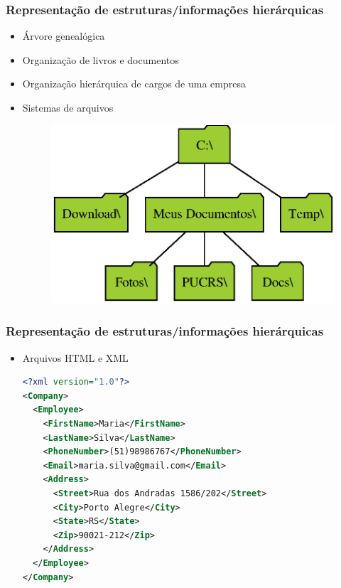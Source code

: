 \documentclass[aspectratio=169]{beamer}
\begin{document}
\begin{frame}\frametitle{Representação de estruturas/informações hierárquicas}
\begin{itemize}
	\item Árvore genealógica
	\item Organização de livros e documentos
	\item Organização hierárquica de cargos de uma empresa
	\item Sistemas de arquivos
\begin{figure}[h]
	\centering
	\includegraphics[height=0.4\paperheight]{imagens/arvore_de_diretorios.eps}
\end{figure}
\end{itemize}
\end{frame}

\begin{frame}[fragile]\frametitle{Representação de estruturas/informações hierárquicas}
\begin{itemize}
	\item Arquivos HTML e XML
\begin{lstlisting}[language=XML,basicstyle=\ttfamily\scriptsize]
<?xml version="1.0"?>
<Company>
  <Employee>
    <FirstName>Maria</FirstName>
    <LastName>Silva</LastName>
    <PhoneNumber>(51)98986767</PhoneNumber>
    <Email>maria.silva@gmail.com</Email>
    <Address>
      <Street>Rua dos Andradas 1586/202</Street>
      <City>Porto Alegre</City>
      <State>RS</State>
      <Zip>90021-212</Zip>
    </Address>
  </Employee>
</Company>
\end{lstlisting}
\end{itemize}
\end{frame}
\end{document}
